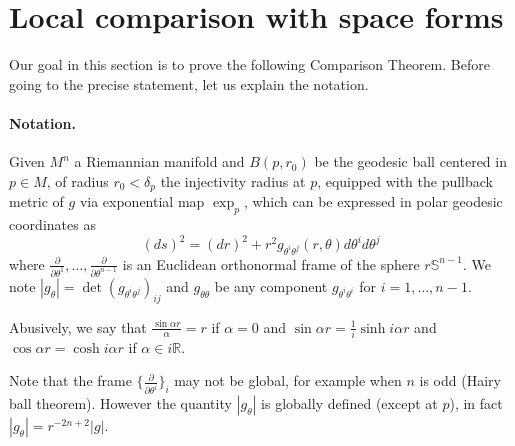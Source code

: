 \documentclass[11pt]{article}
\begin{document}
\section{Local comparison with space forms}
\label{sec:orgdc0da4c}

Our goal in this section is to prove the following Comparison Theorem. Before going to the
precise statement, let us explain the notation.

\paragraph{Notation.}
\label{sec:org4abfd0a}
Given \(M^n\) a Riemannian manifold and \(B(p,r_0)\) be the geodesic ball centered in
\(p\in M\), of radius \(r_0<\delta_p\) the injectivity radius at \(p\), equipped
with the pullback metric of \(g\) via exponential map \(\exp_p\), which can be expressed in polar geodesic coordinates
as 
\[
(ds)^2 = (dr)^2 + r^2 g_{\theta^i\theta^j}(r,\theta) d\theta^i d\theta^j
\]
where \(\frac{\partial}{\partial\theta^1},\dots,\frac{\partial}{\partial\theta^{n-1}}\)
is an Euclidean orthonormal frame of the sphere
\(r\mathbb{S}^{n-1}\). We note \(|g_\theta| = \det(g_{\theta^i\theta^j})_{ij}\) and
\(g_{\theta\theta}\) be any component \(g_{\theta^i\theta^i}\) for \(i=1,\dots,n-1\).

Abusively, we say that \(\frac{\sin \alpha r}{\alpha} = r\) if \(\alpha = 0\) and \(\sin\alpha r =  \frac{1}{i}\sinh i\alpha r\) and \(\cos \alpha r = \cosh i\alpha r\) if \(\alpha\in i \mathbb{R}\).

\begin{remark}
\label{rem:hairy-ball}
Note that the frame \(\{ \frac{\partial}{\partial\theta^i}\}_i\) may not be global, for
example when \(n\) is odd (Hairy ball theorem). However the quantity \(|g_\theta|\) is
globally defined (except at \(p\)), in fact \(|g_\theta| = r^{-2n+2}|g|\).
\end{remark}
\end{document}
